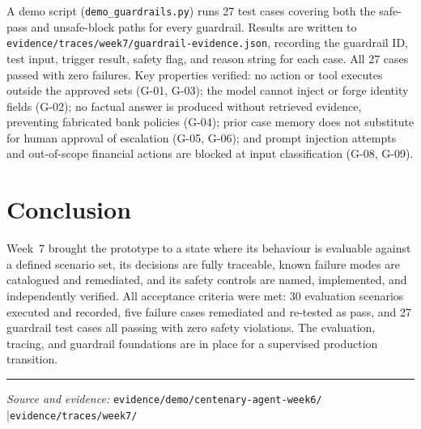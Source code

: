 \documentclass[11pt,a4paper]{article}
\begin{document}
A demo script (\texttt{demo\_guardrails.py}) runs 27 test cases covering both
the safe-pass and unsafe-block paths for every guardrail. Results are written
to \texttt{evidence/traces/week7/guardrail-evidence.json}, recording the
guardrail ID, test input, trigger result, safety flag, and reason string for
each case. All 27 cases passed with zero failures. Key properties verified:
no action or tool executes outside the approved sets (G-01, G-03); the model
cannot inject or forge identity fields (G-02); no factual answer is produced
without retrieved evidence, preventing fabricated bank policies (G-04); prior
case memory does not substitute for human approval of escalation (G-05,
G-06); and prompt injection attempts and out-of-scope financial actions are
blocked at input classification (G-08, G-09).

\section{Conclusion}

Week~7 brought the prototype to a state where its behaviour is evaluable
against a defined scenario set, its decisions are fully traceable, known
failure modes are catalogued and remediated, and its safety controls are
named, implemented, and independently verified. All acceptance criteria were
met: 30 evaluation scenarios executed and recorded, five failure cases
remediated and re-tested as pass, and 27 guardrail test cases all passing
with zero safety violations. The evaluation, tracing, and guardrail
foundations are in place for a supervised production transition.

\vspace{6pt}
\noindent\rule{\textwidth}{0.4pt}
{\small\textit{Source and evidence:} \texttt{evidence/demo/centenary-agent-week6/}
\quad|\quad \texttt{evidence/traces/week7/}}
\end{document}
